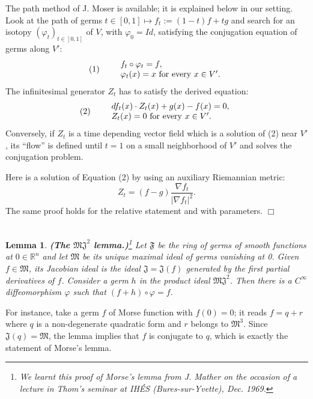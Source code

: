 \documentclass[12pt]{amsart}
\newtheorem{lemme}[thm]{Lemma}
\def\R{\mathbb{R}}
\def\vp{\varphi}
\def\nd{\noindent}
\def\bull{\hfill$\Box$\\}
\begin{document}
\nd{\bf Proof.} The path method of J. Moser \cite{moser} is available; it is explained below in our setting. %
Look at the path of germs 
 $t\in [0,1]\mapsto f_t:= (1-t)f+t g$ and search for an isotopy $\left( \vp_t\right)_{t\in[0,1]}$
 of $V$, with $\vp_0=Id$,
 satisfying the conjugation equation of germs along $V'$:
 $$(1)\quad\quad \begin{array}{l}
 f_t\circ\vp_t= f,\\
 \vp_t(x)=x \ {\rm for \ every\ } x\in V'.
 \end{array}
 $$
 The infinitesimal generator $Z_t$ has to satisfy the derived equation:
 $$(2)\quad\quad \begin{array}{l}
 df_t(x)\cdot Z_t(x)+g(x)-f(x)=0,\\
 Z_t(x)=0 \ {\rm for \ every\ } x\in V'.
 \end{array}
 $$Conversely, if $Z_t$ is a time depending vector field which is a solution of (2) near $V'$,
  its ``flow'' is defined until $t=1$  on a small neighborhood of $V'$ and solves the conjugation problem. 
 
 Here is a solution of Equation (2) by using an auxiliary Riemannian metric:
 $$Z_t= (f-g)\frac{\nabla f_t}{\vert \nabla f_t\vert^2}.
 $$
 The same proof holds for the relative statement and with parameters. \bull\\

\begin{lemme}{\bf (The $\mathfrak{ M J}^2$ lemma.)}\footnote{We learnt this proof of Morse's lemma 
from J. Mather on the occasion of a lecture in  Thom's seminar at IH\'ES (Bures-sur-Yvette), Dec. 1969.}
\label{mj2}
Let $\mathfrak F$ be the ring of germs of smooth functions at $0\in \R^n$ and let $\mathfrak M$ be its
unique  
maximal ideal of germs vanishing at 0. Given $f\in \mathfrak M$, its Jacobian ideal is the ideal $\mathfrak J=\mathfrak J(f)$ generated by 
the first partial derivatives of $f$. Consider a germ $h$ in the product ideal $\mathfrak{ M J}^2$. 
Then there is a $C^\infty $ diffeomorphism $\vp$ such that 
$(f+h)\circ \vp= f$.
\end{lemme}
For instance, %
take a  germ $f$ of Morse function with $f(0)=0$; it  reads
$f= q+r$  where $q$  is a non-degenerate quadratic form and  $r$  belongs to $\mathfrak M^3$. Since 
$\mathfrak J(q)=\mathfrak M$, %
the lemma implies that $f$ is conjugate to $q$, which 
is exactly the  statement of 
Morse's lemma.\\
\end{document}
